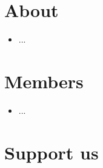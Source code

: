 \documentclass[
notumble,
nofoldmark,
]{leaflet}
\begin{document}
\section{About}

\begin{itemize}
\item ...
\end{itemize} 
 
\newpage  %
\section{Members}

\begin{itemize}
 \item ...
\end{itemize}

     
\newpage   %
\section{Support us}
 

\loggingall
\end{document}
